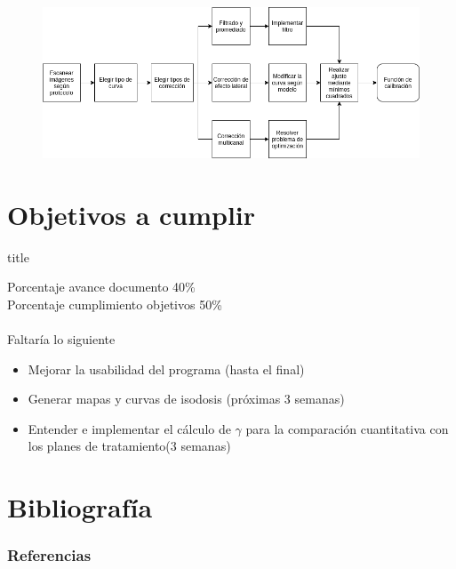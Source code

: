 \documentclass[12pt]{beamer}
\begin{document}
\begin{frame}
\begin{figure}
	\centering
	\includegraphics[width=\linewidth]{images/daigramaFlujo.png}
\end{figure}
\end{frame}






\section{Objetivos a cumplir}
\begin{frame}
\vfill
\centering
\begin{beamercolorbox}[sep=8pt,center,shadow=true,rounded=true]{title}
	\insertsectionhead\par%
\end{beamercolorbox}
\vfill
\end{frame}

\begin{frame}
Porcentaje avance documento 40\% \\
Porcentaje cumplimiento objetivos 50\%\\~\\
Faltaría lo siguiente
\begin{itemize}
	\item Mejorar la usabilidad del programa (hasta el final)
	\item Generar mapas y curvas de isodosis (próximas 3 semanas)
	\item Entender e implementar el cálculo de $\gamma$ para la comparación cuantitativa con los planes de tratamiento(3 semanas)
\end{itemize}
\end{frame}



\section{Bibliografía}
\begin{frame}[allowframebreaks]
\frametitle{Referencias}
\nocite{*}


\end{frame}
\end{document}
